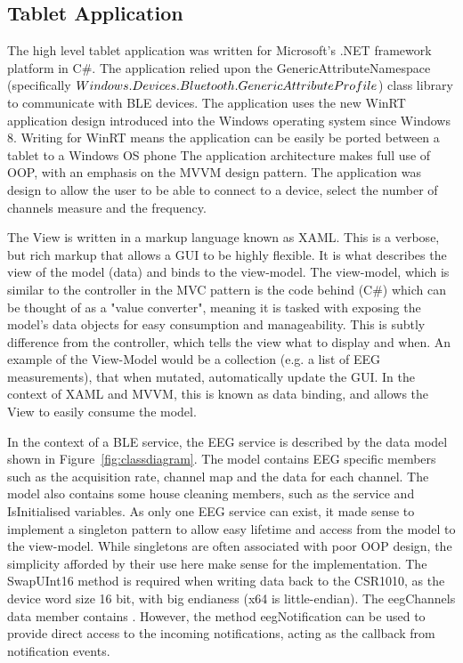 \documentclass[]{article}
\begin{document}
\subsection{Tablet Application}

The high level tablet application was written for Microsoft's .NET framework platform in C\#. The application relied upon the GenericAttributeNamespace (specifically $Windows.Devices.\\Bluetooth.GenericAttributeProfile$) class library to communicate with \ac{BLE} devices. The application uses the new WinRT application design introduced into the Windows operating system since Windows 8. Writing for WinRT means the application can be easily be ported between a tablet to a Windows OS phone The application architecture makes full use of \ac{OOP}, with an emphasis on the \ac{MVVM} design pattern. The application was design to allow the user to be able to connect to a device, select the number of channels measure and the frequency. 

The View is written in a markup language known as \ac{XAML}. This is a verbose, but rich markup that allows a \ac{GUI} to be highly flexible. It is what describes the view of the model (data) and binds to the view-model. The view-model, which is similar to the controller in the \ac{MVC} pattern is the code behind (C\#) which can be thought of as a "value converter", meaning it is tasked with exposing the model's data objects for easy consumption and manageability. This is subtly difference from the controller, which tells the view what to display and when. An example of the View-Model would be a collection (e.g. a list of \ac{EEG} measurements), that when mutated, automatically update the \ac{GUI}. In the context of \ac{XAML} and \ac{MVVM}, this is known as data binding, and allows the View to easily consume the model.

In the context of a \ac{BLE} service, the \ac{EEG} service is described by the data model shown in Figure~\ref{fig:classdiagram}. The model contains \ac{EEG} specific members such as the acquisition rate, channel map and the data for each channel. The model also contains some house cleaning members, such as the service and IsInitialised variables. As only one \ac{EEG} service can exist, it made sense to implement a singleton pattern to allow easy lifetime and access from the model to the view-model. While singletons are often associated with poor \ac{OOP} design, the simplicity afforded by their use here make sense for the implementation. The SwapUInt16 method is required when writing data back to the CSR1010, as the device word size 16 bit, with big endianess (x64 is little-endian). The eegChannels data member contains . However, the method eegNotification can be used to provide direct access to the incoming notifications, acting as the callback from notification events.
\end{document}

